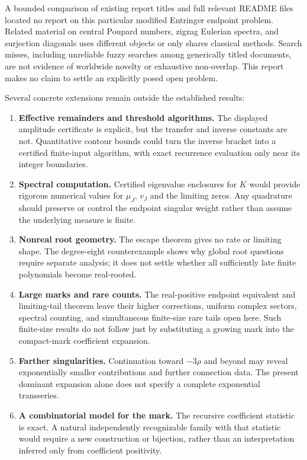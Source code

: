 \documentclass[11pt,letterpaper]{article}
\theoremstyle{remark}\newtheorem{remark}[theorem]{Remark}
\begin{document}
A bounded comparison of existing report titles and full relevant README files located no report on this particular modified Entringer endpoint problem. Related material on central Poupard numbers, zigzag Eulerian spectra, and surjection diagonals uses different objects or only shares classical methods. Search misses, including unreliable fuzzy searches among generically titled documents, are not evidence of worldwide novelty or exhaustive non-overlap. This report makes no claim to settle an explicitly posed open problem.

Several concrete extensions remain outside the established results:
\begin{enumerate}
 \item \textbf{Effective remainders and threshold algorithms.} The displayed amplitude certificate is explicit, but the transfer and inverse constants are not. Quantitative contour bounds could turn the inverse bracket into a certified finite-input algorithm, with exact recurrence evaluation only near its integer boundaries.
 \item \textbf{Spectral computation.} Certified eigenvalue enclosures for $K$ would provide rigorous numerical values for $\mu_J$, $v_J$ and the limiting zeros. Any quadrature should preserve or control the endpoint singular weight rather than assume the underlying measure is finite.
 \item \textbf{Nonreal root geometry.} The escape theorem gives no rate or limiting shape. The degree-eight counterexample shows why global root questions require separate analysis; it does not settle whether all sufficiently late finite polynomials become real-rooted.
 \item \textbf{Large marks and rare counts.} The real-positive endpoint equivalent and limiting-tail theorem leave their higher corrections, uniform complex sectors, spectral counting, and simultaneous finite-size rare tails open here. Such finite-size results do not follow just by substituting a growing mark into the compact-mark coefficient expansion.
 \item \textbf{Farther singularities.} Continuation toward $-3\rho$ and beyond may reveal exponentially smaller contributions and further connection data. The present dominant expansion alone does not specify a complete exponential transseries.
 \item \textbf{A combinatorial model for the mark.} The recursive coefficient statistic is exact. A natural independently recognizable family with that statistic would require a new construction or bijection, rather than an interpretation inferred only from coefficient positivity.
\end{enumerate}
\end{document}

